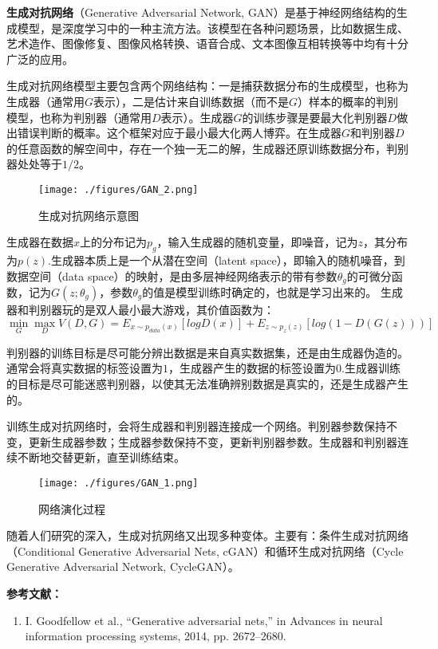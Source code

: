 
\textbf{生成对抗网络}（Generative Adversarial Network, GAN）是基于神经网络结构的生成模型，是深度学习中的一种主流方法。该模型在各种问题场景，比如数据生成、艺术造作、图像修复、图像风格转换、语音合成、文本图像互相转换等中均有十分广泛的应用。

生成对抗网络模型主要包含两个网络结构：一是捕获数据分布的生成模型，也称为生成器（通常用$G$表示），二是估计来自训练数据（而不是$G$）样本的概率的判别模型，也称为判别器（通常用$D$表示）。生成器$G$的训练步骤是要最大化判别器$D$做出错误判断的概率。这个框架对应于最小最大化两人博弈。在生成器$G$和判别器$D$的任意函数的解空间中，存在一个独一无二的解，生成器还原训练数据分布，判别器处处等于$1/2$。

\begin{figure}[ht]
\centering
\texttt{[image: ./figures/GAN\_2.png]}
\caption{生成对抗网络示意图} \label{GAN_fig2}
\end{figure}

生成器在数据$x$上的分布记为$p_g$，输入生成器的随机变量，即噪音，记为$z$，其分布为$p(z)$.生成器本质上是一个从潜在空间（latent space），即输入的随机噪音，到数据空间（data space）的映射，是由多层神经网络表示的带有参数$\theta_g$的可微分函数，记为$G(z;\theta_g)$，参数$\theta_g$的值是模型训练时确定的，也就是学习出来的。
生成器和判别器玩的是双人最小最大游戏，其价值函数为：
\begin{equation}
\mathop{\min}\limits_G \mathop {\max }\limits_D V(D,G)=E_{x\sim p_{data}(x)}[logD(x)]+E_{z\sim p_z(z)}[log(1-D(G(z)))]
\end{equation}


判别器的训练目标是尽可能分辨出数据是来自真实数据集，还是由生成器伪造的。通常会将真实数据的标签设置为$1$，生成器产生的数据的标签设置为$0$.生成器训练的目标是尽可能迷惑判别器，以使其无法准确辨别数据是真实的，还是生成器产生的。

训练生成对抗网络时，会将生成器和判别器连接成一个网络。判别器参数保持不变，更新生成器参数；生成器参数保持不变，更新判别器参数。生成器和判别器连续不断地交替更新，直至训练结束。
\begin{figure}[ht]
\centering
\texttt{[image: ./figures/GAN\_1.png]}
\caption{网络演化过程} \label{GAN_fig1}
\end{figure}

随着人们研究的深入，生成对抗网络又出现多种变体。主要有：条件生成对抗网络（Conditional Generative Adversarial Nets, cGAN）和循环生成对抗网络（Cycle Generative Adversarial Network, CycleGAN）。




\textbf{参考文献：}
\begin{enumerate}
\item I. Goodfellow et al., “Generative adversarial nets,” in Advances in neural information processing systems, 2014, pp. 2672–2680.
\end{enumerate}